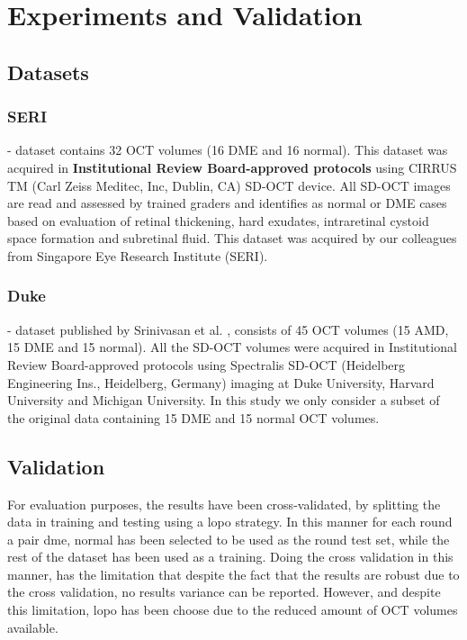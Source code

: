 
\section{Experiments and Validation }
\subsection{Datasets}
\subsubsection{SERI} - dataset contains 32 OCT volumes (16 DME and 16 normal). This dataset was acquired in \textbf{Institutional Review Board-approved protocols} using CIRRUS TM (Carl Zeiss Meditec, Inc, Dublin, CA) SD-OCT device. All SD-OCT images are read and assessed by trained graders and identifies as normal or DME cases based on evaluation of retinal thickening, hard exudates, intraretinal cystoid space formation and subretinal fluid. This dataset was acquired by our colleagues from Singapore Eye Research Institute (SERI). 

\subsubsection{Duke} - dataset published by Srinivasan et al. \cite{Srinivasan2014}, consists of 45 OCT volumes (15 AMD, 15 DME and 15 normal). All the SD-OCT volumes were acquired in Institutional Review Board-approved protocols using Spectralis SD-OCT (Heidelberg Engineering Ins., Heidelberg, Germany) imaging at Duke University, Harvard University and Michigan University. In this study we only consider a subset of the original data containing 15 DME and 15 normal OCT volumes.

\subsection{Validation}
For evaluation purposes, the results have been cross-validated, by splitting the data in training and testing using a \ac{lopo} strategy. In this manner for each round a pair \ac{dme}, normal has been selected to be used as the round test set, while the rest of the dataset has been used as a training. Doing the cross validation in this manner, has the limitation that despite the fact that the results are robust due to the cross validation, no results variance can be reported. However, and despite this limitation, \ac{lopo} has been choose due to the reduced amount of OCT volumes available.

